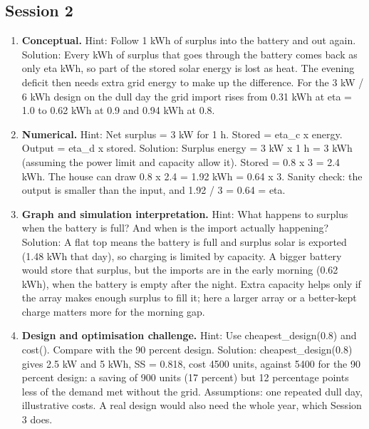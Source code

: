 \documentclass[11pt,a4paper]{article}
\begin{document}
\subsection*{Session 2}
\begin{enumerate}[nosep]
\item \textbf{Conceptual.} Hint: Follow 1 kWh of surplus into the battery and out again. Solution: Every kWh of surplus that goes through the battery comes back as only eta kWh, so part of the stored solar energy is lost as heat. The evening deficit then needs extra grid energy to make up the difference. For the 3 kW / 6 kWh design on the dull day the grid import rises from 0.31 kWh at eta = 1.0 to 0.62 kWh at 0.9 and 0.94 kWh at 0.8.
\item \textbf{Numerical.} Hint: Net surplus = 3 kW for 1 h. Stored = eta\_c x energy. Output = eta\_d x stored. Solution: Surplus energy = 3 kW x 1 h = 3 kWh (assuming the power limit and capacity allow it). Stored = 0.8 x 3 = 2.4 kWh. The house can draw 0.8 x 2.4 = 1.92 kWh = 0.64 x 3. Sanity check: the output is smaller than the input, and 1.92 / 3 = 0.64 = eta.
\item \textbf{Graph and simulation interpretation.} Hint: What happens to surplus when the battery is full? And when is the import actually happening? Solution: A flat top means the battery is full and surplus solar is exported (1.48 kWh that day), so charging is limited by capacity. A bigger battery would store that surplus, but the imports are in the early morning (0.62 kWh), when the battery is empty after the night. Extra capacity helps only if the array makes enough surplus to fill it; here a larger array or a better-kept charge matters more for the morning gap.
\item \textbf{Design and optimisation challenge.} Hint: Use cheapest\_design(0.8) and cost(). Compare with the 90 percent design. Solution: cheapest\_design(0.8) gives 2.5 kW and 5 kWh, SS = 0.818, cost 4500 units, against 5400 for the 90 percent design: a saving of 900 units (17 percent) but 12 percentage points less of the demand met without the grid. Assumptions: one repeated dull day, illustrative costs. A real design would also need the whole year, which Session 3 does.
\end{enumerate}
\end{document}
